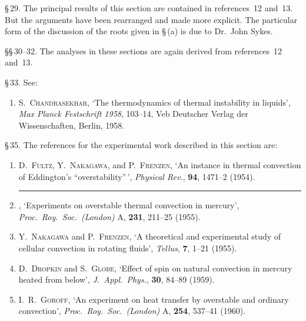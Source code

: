 \noindent \S\,29.  The principal results of this section are contained in references~12 and~13.
But the arguments have been rearranged and made more explicit.  The particular
form of the discussion of the roots given in \S\,(a) is due to Dr.\ John Sykes.

\noindent \S\S\,30--32.  The analyses in these sections are again derived from references~12
and~13.

\noindent \S\,33.  See:
\begin{enumerate}
\item[15.] S.\ \textsc{Chandrasekhar}, `The thermodynamics of thermal instability in
  liquids', \emph{Max Planck Festschrift 1958}, 103--14, Veb Deutscher Verlag der
  Wissenschaften, Berlin, 1958.
\end{enumerate}

\noindent \S\,35.  The references for the experimental work described in this section are:
\begin{enumerate}
\item[16.] D.\ \textsc{Fultz}, Y.\ \textsc{Nakagawa}, and P.\ \textsc{Frenzen}, `An instance in thermal
  convection of Eddington's ``overstability''\,', \emph{Physical Rev.}, \textbf{94}, 1471--2
  (1954).
\item[17.] \rule{2em}{0.4pt}, `Experiments on overstable thermal convection in mercury',
  \emph{Proc.\ Roy.\ Soc.\ (London)} A, \textbf{231}, 211--25 (1955).
\item[18.] Y.\ \textsc{Nakagawa} and P.\ \textsc{Frenzen}, `A theoretical and experimental study of
  cellular convection in rotating fluids', \emph{Tellus}, \textbf{7}, 1--21 (1955).
\item[19.] D.\ \textsc{Dropkin} and S.\ \textsc{Globe}, `Effect of spin on natural convection in
  mercury heated from below', \emph{J.\ Appl.\ Phys.}, \textbf{30}, 84--89 (1959).
\item[20.] I.\ R.\ \textsc{Goroff}, `An experiment on heat transfer by overstable and ordinary
  convection', \emph{Proc.\ Roy.\ Soc.\ (London)} A, \textbf{254}, 537--41 (1960).
\end{enumerate}
